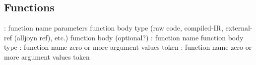 \documentclass{note}
\begin{document}
\subsection{Functions}
\bit
{}: 
   \bit
   \w function name
   \w parameters
   \w function body type (raw code, compiled-IR, external-ref (alljoyn ref), etc.)
   \w function body (optional?)
   \eit
{}:
   \bit
   \w function name
   \w function body type
   \eit
{}: 
   \bit
   \w function name
   \w zero or more argument values
   \w token
   \eit
{}:
   \bit
   \w function name
   \w zero or more argument values
   \w token
   \eit
\eit





%
%
\end{document}

